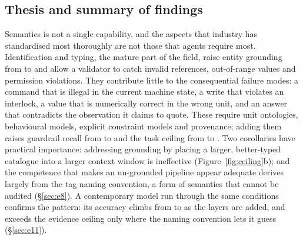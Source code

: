 \subsection{Thesis and summary of findings}

Semantics is not a single capability, and the aspects that industry has
standardised most thoroughly are not those that agents require most.
Identification and typing, the mature part of the field, raise entity grounding
from \GrndTopOneCZero{} to \GrndTopOneCTwo{} and allow a validator to catch
invalid references, out-of-range values and permission violations. They
contribute little to the consequential failure modes: a command that is illegal
in the current machine state, a write that violates an interlock, a value that is
numerically correct in the wrong unit, and an answer that contradicts the
observation it claims to quote. These require unit ontologies, behavioural models,
explicit constraint models and provenance; adding them raises guardrail recall
from \RecallGTwo{} to \RecallGFour{} and the task ceiling from \CeilingCTwo{} to
\CeilingCFour{}. Two corollaries have practical importance: addressing grounding
by placing a larger, better-typed catalogue into a larger context window is
ineffective (Figure~\ref{fig:ceiling}b); and the competence that makes an
un-grounded pipeline appear adequate derives largely from the tag naming
convention, a form of semantics that cannot be audited (\S\ref{sec:e8}). A
contemporary model run through the same conditions confirms the pattern: its
accuracy climbs from \EllAccCZero{} to \EllAccCFour{} as the layers are added, and
exceeds the evidence ceiling only where the naming convention lets it guess
(\S\ref{sec:e11}).
